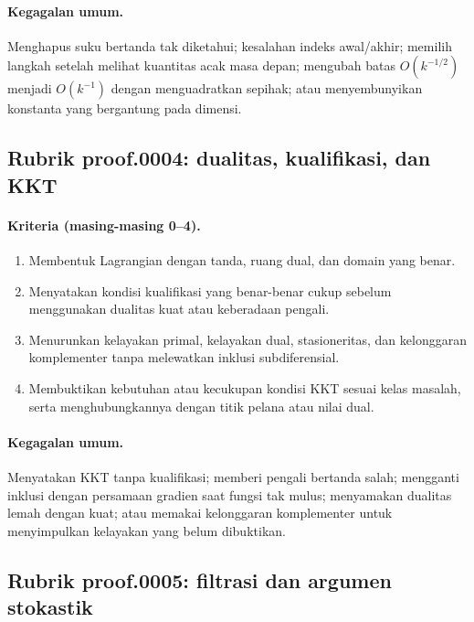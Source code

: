 \paragraph{Kegagalan umum.}
Menghapus suku bertanda tak diketahui; kesalahan indeks awal/akhir; memilih
langkah setelah melihat kuantitas acak masa depan; mengubah batas
$O(k^{-1/2})$ menjadi $O(k^{-1})$ dengan menguadratkan sepihak; atau
menyembunyikan konstanta yang bergantung pada dimensi.

\subsection{Rubrik proof.0004: dualitas, kualifikasi, dan KKT}
\label{orig03:rubric:proof:0004}

\paragraph{Kriteria (masing-masing 0--4).}
\begin{enumerate}
  \item Membentuk Lagrangian dengan tanda, ruang dual, dan domain yang benar.
  \item Menyatakan kondisi kualifikasi yang benar-benar cukup sebelum
  menggunakan dualitas kuat atau keberadaan pengali.
  \item Menurunkan kelayakan primal, kelayakan dual, stasioneritas, dan
  kelonggaran komplementer tanpa melewatkan inklusi subdiferensial.
  \item Membuktikan kebutuhan atau kecukupan kondisi KKT sesuai kelas masalah,
  serta menghubungkannya dengan titik pelana atau nilai dual.
\end{enumerate}

\paragraph{Kegagalan umum.}
Menyatakan KKT tanpa kualifikasi; memberi pengali bertanda salah; mengganti
inklusi dengan persamaan gradien saat fungsi tak mulus; menyamakan dualitas
lemah dengan kuat; atau memakai kelonggaran komplementer untuk menyimpulkan
kelayakan yang belum dibuktikan.

\subsection{Rubrik proof.0005: filtrasi dan argumen stokastik}
\label{orig03:rubric:proof:0005}

